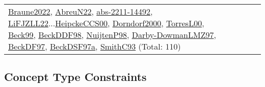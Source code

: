 {\begin{longtable}{p{3cm}r>{\raggedright\arraybackslash}p{6cm}>{\raggedright\arraybackslash}p{6cm}>{\raggedright\arraybackslash}p{8cm}}
\hyperref[detail:Braune2022]{Braune2022}, \hyperref[detail:AbreuN22]{AbreuN22}, \hyperref[detail:abs-2211-14492]{abs-2211-14492}, \hyperref[detail:LiFJZLL22]{LiFJZLL22}...\hyperref[detail:HeipckeCCS00]{HeipckeCCS00}, \hyperref[detail:Dorndorf2000]{Dorndorf2000}, \hyperref[detail:TorresL00]{TorresL00}, \hyperref[detail:Beck99]{Beck99}, \hyperref[detail:BeckDDF98]{BeckDDF98}, \hyperref[detail:NuijtenP98]{NuijtenP98}, \hyperref[detail:Darby-DowmanLMZ97]{Darby-DowmanLMZ97}, \hyperref[detail:BeckDF97]{BeckDF97}, \hyperref[detail:BeckDSF97a]{BeckDSF97a}, \hyperref[detail:SmithC93]{SmithC93} (Total: 110)\\
\end{longtable}
}

\clearpage
\subsection{Concept Type Constraints}
\label{sec:Constraints}
\label{Constraints}
